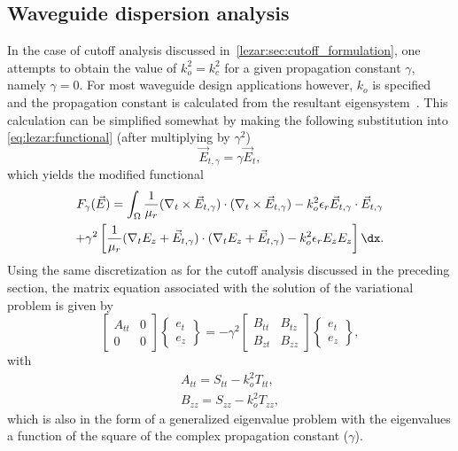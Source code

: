 \subsection{Waveguide dispersion analysis}
\label{lezar:sec:propagation_curves}
In the case of cutoff analysis discussed in~\ref{lezar:sec:cutoff_formulation}, one attempts to obtain the value of $k_o^2 = k_c^2$ for a given propagation constant $\gamma$, namely $\gamma = 0$.  For most waveguide design applications however, $k_o$ is specified and the propagation constant is calculated from the resultant eigensystem~\citep{Jin2002, PelosiCoccioliSelleri1998}. This calculation can be simplified somewhat by making the following substitution into \eqref{eq:lezar:functional} (after multiplying by $\gamma^2$)
\begin{equation}
    \vec{E}_{t,\gamma} = \gamma\vec{E}_t,
\end{equation}
which yields the modified functional
\begin{multline}
    \label{eq:lezar:functional_scaled}
    F_\gamma(\vec{E}) =
    \int_{\Omega}\frac{1}{\mu_r}(\nabla_t\times{\vec{E}_{t,\gamma}})\cdot(\nabla_t\times{\vec{E}_{t,\gamma}}) -k_o^2\epsilon_r\vec{E}_{t,\gamma}\cdot{\vec{E}_{t,\gamma}}\\
    +\gamma^2\left[\frac{1}{\mu_r}(\nabla_t{E_z} +
    \vec{E}_{t,\gamma})\cdot(\nabla_t{E_z} + \vec{E}_{t,\gamma})-k_o^2\epsilon_r
    E_z{E_z}\right] \dx.
\end{multline}
Using the same discretization as for the cutoff analysis discussed in the preceding section, the matrix equation associated with the solution of the variational problem is given by~\citep{PelosiCoccioliSelleri1998}
\begin{equation}
    \label{eq:lezar:matrix_equation_dispersion}
    \begin{bmatrix} A_{tt} & 0\\0 & 0\end{bmatrix}\begin{Bmatrix}e_t\\e_z\end{Bmatrix} =
    -\gamma^2\begin{bmatrix} B_{tt} & B_{tz}\\B_{zt} &
    B_{zz}\end{bmatrix}\begin{Bmatrix}e_t\\e_z\end{Bmatrix},
\end{equation}
with
\begin{align}
    \label{eq:lezar:A_tt}
    A_{tt} = S_{tt} - k_o^2 T_{tt},\\
    \label{eq:lezar:B_zz}
    B_{zz} = S_{zz} - k_o^2 T_{zz},
\end{align}
which is also in the form of a generalized eigenvalue problem with the eigenvalues a function of the square of the complex propagation constant ($\gamma$).

